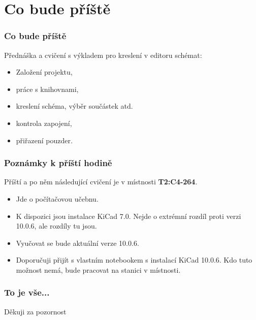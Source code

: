 \documentclass{beamer}
\newcommand{\kicadVersion}{10.0.6}
\begin{document}
\section{\texorpdfstring{Co bude příště}{Co bude priste}}
	\begin{frame}
    \frametitle{Co bude příště}
	
		Přednáška a cvičení s výkladem pro kreslení v editoru schémat:
		\begin{itemize}
			\item Založení projektu,
			\item práce s knihovnami,
			\item kreslení schéma, výběr součástek atd.
			\item kontrola zapojení,
			\item přiřazení pouzder.
		\end{itemize}
	\end{frame}
	\begin{frame}
    \frametitle{Poznámky k příští hodině}
		
		Příští a po něm následující cvičení je v místnosti \textbf{T2:C4-264}.
		\begin{itemize}
			\item Jde o počítačovou učebnu.
			\item K dispozici jsou instalace KiCad 7.0. Nejde o extrémní rozdíl proti verzi \kicadVersion, ale rozdíly tu jsou.
			\item Vyučovat se bude aktuální verze \kicadVersion.
			\item Doporučuji přijít s vlastním notebookem s instalací KiCad \kicadVersion. Kdo tuto možnost nemá, bude pracovat na stanici v místnosti.
		\end{itemize}
	\end{frame}
	\begin{frame}
    \frametitle{To je vše...}
		
		\begin{center}
			\Large{Děkuji za pozornost}
		\end{center}
	\end{frame}
\end{document}
